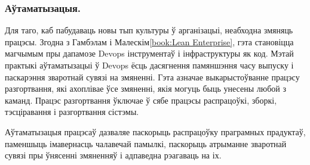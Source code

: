 \subsubsection{Аўтаматызацыя.}

Для таго, каб пабудаваць новы тып культуры ў арганізацыі,
неабходна змяняць працэсы.
Згодна з Гамбэлам і Малескім\ref{book:Lean Enterprise},
гэта становіцца магчымым пры дапамозе Devops інструментаў і 
інфраструктуры як код. Мэтай практыкі аўтаматызацыі ў Devops
ёсць дасягнення памяншэння часу выпуску і паскарэння зваротнай
сувязі на змяненні.
Гэта азначае выкарыстоўванне працэсу разгортвання,
які ахоплівае ўсе змяненні, якія могуць быць унесены любой з каманд.
Працэс разгортвання ўключае ў сябе працэсы распрацоўкі, зборкі,
тэсціравання і разгортвання сістэмы.

Аўтаматызацыя працэсаў дазваляе паскорыць распрацоўку
праграмных прадуктаў, паменшыць імавернасць чалавечай памылкі,
паскорыць атрыманне зваротнай сувязі пры ўнясенні змяненняў і
адпаведна рэагаваць на іх.
%
%
%
%
%
%
%

